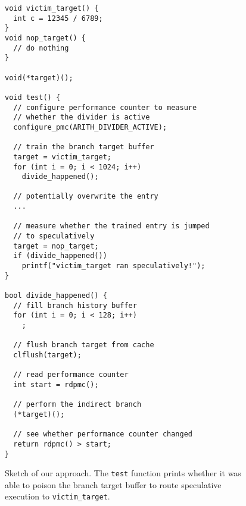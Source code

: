
\begin{figure}[h]
\begin{lstlisting}
void victim_target() {
  int c = 12345 / 6789;
}
void nop_target() {
  // do nothing
}

void(*target)();

void test() {
  // configure performance counter to measure
  // whether the divider is active
  configure_pmc(ARITH_DIVIDER_ACTIVE);

  // train the branch target buffer
  target = victim_target;
  for (int i = 0; i < 1024; i++)
    divide_happened();

  // potentially overwrite the entry
  ...

  // measure whether the trained entry is jumped
  // to speculatively
  target = nop_target;
  if (divide_happened())
    printf("victim_target ran speculatively!");
}

bool divide_happened() {
  // fill branch history buffer
  for (int i = 0; i < 128; i++)
    ;

  // flush branch target from cache
  clflush(target);

  // read performance counter
  int start = rdpmc();

  // perform the indirect branch
  (*target)();

  // see whether performance counter changed
  return rdpmc() > start;
}\end{lstlisting}
\caption{Sketch of our approach. The \texttt{test} function prints whether it was able to poison the branch target buffer to route speculative execution to \texttt{victim\_target}.}
\label{fig:spectre2-sample}
\end{figure}

